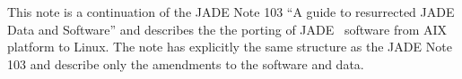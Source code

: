 
This note is a continuation of the JADE Note 103
``A guide to resurrected JADE Data and Software'' and describes the 
the porting of JADE~\cite{Bartel:1986ua} software from AIX platform to Linux.
The note has explicitly the same structure as the JADE Note 103 and describe only 
the amendments to the software and data.
